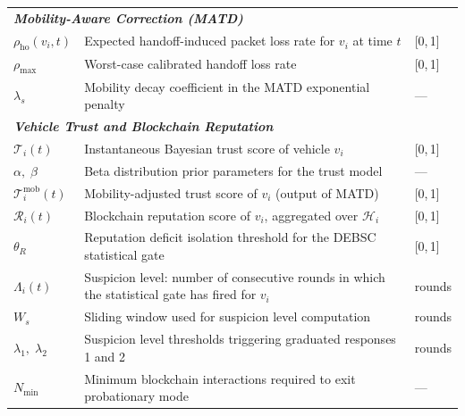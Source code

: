 \documentclass[12pt, a4paper]{report}
\begin{document}
\begin{longtable}{p{2.6cm} p{9.2cm} p{1.9cm}}
\multicolumn{3}{l}{\textit{\textbf{Mobility-Aware Correction (MATD)}}} \\[2pt]
$\rho_\mathrm{ho}(v_i,t)$ & Expected handoff-induced packet loss rate for $v_i$ at time $t$ & [0,\,1] \\
$\rho_\mathrm{max}$ & Worst-case calibrated handoff loss rate & [0,\,1] \\
$\lambda_s$ & Mobility decay coefficient in the MATD exponential penalty & --- \\[6pt]

\multicolumn{3}{l}{\textit{\textbf{Vehicle Trust and Blockchain Reputation}}} \\[2pt]
$\mathcal{T}_i(t)$ & Instantaneous Bayesian trust score of vehicle $v_i$ & [0,\,1] \\
$\alpha,\;\beta$ & Beta distribution prior parameters for the trust model & --- \\
$\mathcal{T}_i^{\text{mob}}(t)$ & Mobility-adjusted trust score of $v_i$ (output of MATD) & [0,\,1] \\
$\mathcal{R}_i(t)$ & Blockchain reputation score of $v_i$, aggregated over $\mathcal{H}_i$ & [0,\,1] \\
$\theta_R$ & Reputation deficit isolation threshold for the DEBSC statistical gate & [0,\,1] \\
$\Lambda_i(t)$ & Suspicion level: number of consecutive rounds in which the statistical gate has fired for $v_i$ & rounds \\
$W_s$ & Sliding window used for suspicion level computation & rounds \\
$\lambda_1,\;\lambda_2$ & Suspicion level thresholds triggering graduated responses 1 and 2 & rounds \\
$N_\mathrm{min}$ & Minimum blockchain interactions required to exit probationary mode & --- \\[6pt]


\end{longtable}
\end{document}

